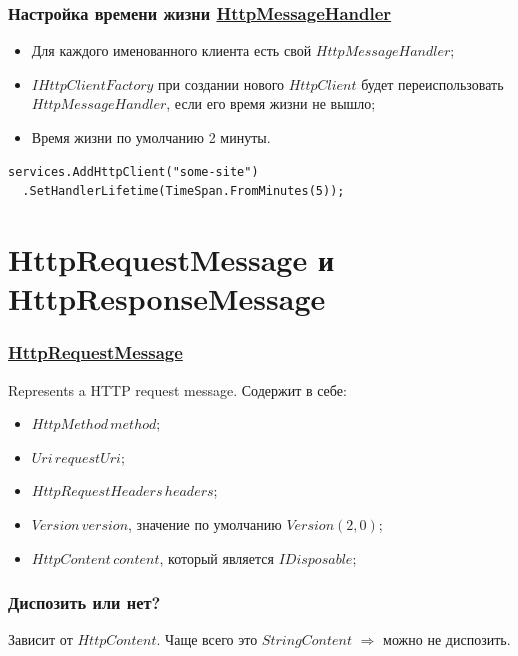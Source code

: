 \documentclass{beamer}
\begin{document}
\begin{frame}[fragile]
\frametitle{Настройка времени жизни \href{https://docs.microsoft.com/en-us/dotnet/api/system.net.http.socketshttphandler?view=netcore-2.2}{HttpMessageHandler}}
\begin{itemize}
\item Для каждого именованного клиента есть свой $HttpMessageHandler$;
\item $IHttpClientFactory$ при создании нового $HttpClient$ будет переиспользовать $HttpMessageHandler$, если его время жизни не вышло;
\item Время жизни по умолчанию 2 минуты.
\end{itemize}
\begin{lstlisting}
services.AddHttpClient("some-site")
  .SetHandlerLifetime(TimeSpan.FromMinutes(5));
\end{lstlisting}
\end{frame}


\section{HttpRequestMessage и HttpResponseMessage}
\begin{frame}
\frametitle{\href{https://docs.microsoft.com/en-us/dotnet/api/system.net.http.httprequestmessage?view=netcore-2.2}{HttpRequestMessage}}
Represents a HTTP request message. 
\newline
\newline
Содержит в себе:
\begin{itemize}
	\item $HttpMethod\,method$;
	\item $Uri\,requestUri$;
	\item $HttpRequestHeaders\,headers$;
	\item $Version\,version$, значение по умолчанию $Version(2, 0)$;
	\item $HttpContent\,content$, который является $IDisposable$;
\end{itemize}
\end{frame}

\begin{frame}
\frametitle{Диспозить или нет?}
Зависит от $HttpContent$. Чаще всего это $StringContent$ $\Rightarrow$ можно не диспозить.
\end{frame}
\end{document}
